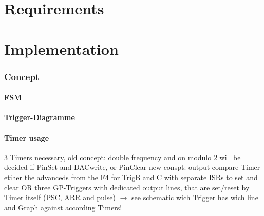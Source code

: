 \documentclass[master,english,smartquotes,apa]{hgbthesis}
\begin{document}
	
	\chapter{Requirements}
	\label{cha:Requirements}

	\chapter{Implementation}
	\label{cha:Implementation}
		\subsection{Concept}
		\subsubsection{FSM}
		\subsubsection{Trigger-Diagramme}
		\subsubsection{Timer usage}
			3 Timers necessary, old concept: double frequency and on modulo 2 will be decided if PinSet and DACwrite, or PinClear
			new conspt: output compare Timer etiher the advanceds from the F4 for TrigB and C with separate ISRs to set and clear
						OR three GP-Triggers with dedicated output lines, that are set/reset by Timer itself (PSC, ARR and pulse)
						$\rightarrow$ see schematic wich Trigger has wich line and Graph against according Timers!
\end{document}
